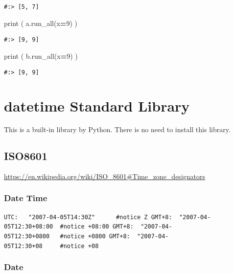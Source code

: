 \documentclass[
]{book}
\newenvironment{Shaded}{\begin{snugshade}}{\end{snugshade}}
\newcommand{\BuiltInTok}[1]{#1}
\newcommand{\DecValTok}[1]{\textcolor[rgb]{0.06,0.06,0.06}{#1}}
\newcommand{\NormalTok}[1]{#1}
\newcommand{\OperatorTok}[1]{\textcolor[rgb]{0.43,0.43,0.43}{\textbf{#1}}}
\begin{document}
\begin{verbatim}
#:> [5, 7]
\end{verbatim}

\begin{Shaded}
\begin{Highlighting}[]
\BuiltInTok{print}\NormalTok{ ( a.run_all(x}\OperatorTok{=}\DecValTok{9}\NormalTok{) )}
\end{Highlighting}
\end{Shaded}

\begin{verbatim}
#:> [9, 9]
\end{verbatim}

\begin{Shaded}
\begin{Highlighting}[]
\BuiltInTok{print}\NormalTok{ ( b.run_all(x}\OperatorTok{=}\DecValTok{9}\NormalTok{) )}
\end{Highlighting}
\end{Shaded}

\begin{verbatim}
#:> [9, 9]
\end{verbatim}

\hypertarget{datetime-standard-library}{%
\chapter{datetime Standard Library}\label{datetime-standard-library}}

This is a built-in library by Python. There is no need to install this library.

\hypertarget{iso8601}{%
\section{ISO8601}\label{iso8601}}

\url{https://en.wikipedia.org/wiki/ISO_8601\#Time_zone_designators}

\hypertarget{date-time}{%
\subsection{Date Time}\label{date-time}}

\texttt{UTC:\ \ \ "2007-04-05T14:30Z"\ \ \ \ \ \ \#notice\ Z\ GMT+8:\ \ "2007-04-05T12:30+08:00\ \ \#notice\ +08:00\ GMT+8:\ \ "2007-04-05T12:30+0800\ \ \ \#notice\ +0800\ GMT+8:\ \ "2007-04-05T12:30+08\ \ \ \ \ \#notice\ +08}

\hypertarget{date}{%
\subsection{Date}\label{date}}
\end{document}
